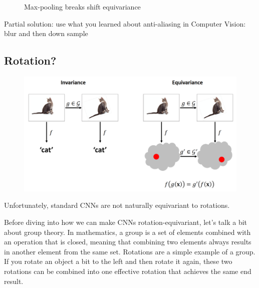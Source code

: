 \documentclass[11pt]{article}
\begin{document}
\begin{figure}
    \caption{Max-pooling breaks shift equivariance}
\end{figure}

Partial solution: use what you learned about anti-aliasing in Computer Vision: blur and then down sample

\subsection{Rotation?}

\begin{figure}[H]
    \centering
    \includegraphics[width=.6\linewidth]{figures/cat-rotation.png}
\end{figure}

Unfortunately, standard CNNs are not naturally equivariant to rotations.

Before diving into how we can make CNNs rotation-equivariant, let's talk a bit about group theory. In mathematics, a group is a set of elements combined with an operation that is closed, meaning that combining two elements always results in another element from the same set. Rotations are a simple example of a group. If you rotate an object a bit to the left and then rotate it again, these two rotations can be combined into one effective rotation that achieves the same end result.
\end{document}
